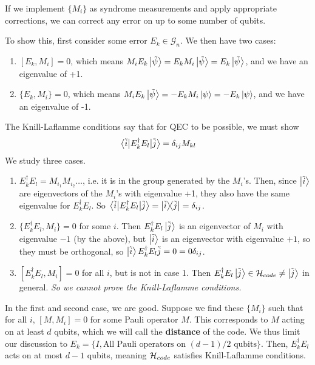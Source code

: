 \begin{theorem}
If we implement $\{M_i\}$ as syndrome measurements and apply appropriate corrections, we can correct any error
on up to some number of qubits.

    To show this, first consider some error $E_k \in \mathcal{G}_n$. We then have two cases:
    \begin{enumerate}
        \item $[E_k, M_i] = 0$, which means $M_i E_k \ket{\tilde{\psi}} = E_k M_i \ket{\tilde{\psi}} = E_k \ket{\tilde{\psi}}$,
        and we have an eigenvalue of +1.
        \item $\{E_k, M_i\} = 0$, which means $M_i E_k \ket{\tilde{\psi}} = - E_k M_i \ket{\psi} = -E_k \ket{\psi}$,
        and we have an eigenvalue of -1.
    \end{enumerate}
            
            The Knill-Laflamme conditions say that for QEC to be possible, we must show
            \[ \mel{\tilde{i}}{E_k^{\dagger} E_{l}}{\tilde{j}} = \delta_{ij} M_{k l} \]
            We study three cases.
            \begin{enumerate}
                \item $E_k^{\dagger} E_{l} = M_{i_1} M_{i_2} \dots$, i.e. it is in the group generated by the $M_{i}$'s. Then,
                since $\ket{\tilde{i}}$ are eigenvectors of the $M_i$'s with eigenvalue +1, they also have the same eigenvalue for $E_k^{\dagger} E_{l}$.
                So $\mel{\tilde{i}}{E_k^{\dagger} E_l}{\tilde{j}} = \ketbra{\tilde{i}}{\tilde{j}} = \delta_{ij}$.
                \item $\{E_k^{\dagger} E_l, M_i\} = 0$ for some $i$. Then $E_k^{\dagger} E_l \ket{\tilde{j}}$ is an eigenvector of $M_i$ with eigenvalue $-1$ (by the above),
                but $\ket{\tilde{i}}$ is an eigenvector with eigenvalue $+1$, so they must be orthogonal, so $\ket{\tilde{i}}{E_k^{\dagger} E_l}{\tilde{j}} = 0 = 0 \delta_{ij}$.
                \item $[E_k^{\dagger} E_l, M_i] = 0$ for all $i$, but is not in case 1. Then $E_k^{\dagger} E_l \ket{\tilde{j}} \in \operatorname{\mathcal{H}}_{code} \neq \ket{\tilde{j}}$ in general.
                \emph{So we cannot prove the Knill-Laflamme conditions.}
            \end{enumerate}
    In the first and second case, we are good. Suppose we find these $\{M_i\}$ such that
    for all $i$, $[M, M_i] = 0$ for some Pauli operator $M$. This corresponds to $M$ acting on at least $d$ qubits, which we will call the \textbf{distance} of the code.
    We thus limit our discussion to $E_k = \{ I, \text{All Pauli operators on $(d - 1)/2$ qubits} \}$. Then, $E_k^{\dagger} E_l$ acts on at most $d - 1$ qubits,
    meaning $\operatorname{\mathcal{H}}_{code}$ satisfies Knill-Laflamme conditions.
\end{theorem}

